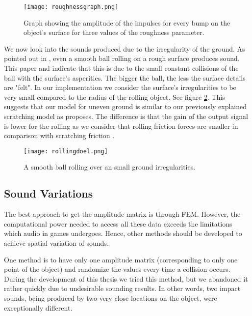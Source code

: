 \begin{figure}[H]
  \centering
    \texttt{[image: roughnessgraph.png]}
      \caption{Graph showing the amplitude of the impulses for every bump on the object's surface for three values of the roughness parameter.}
      \label{fig:roughnessgraph}
\end{figure} 

We now look into the sounds produced due to the irregularity of the ground. As pointed out in \cite{van2001foleyautomatic}, even a smooth ball rolling on a rough surface produces sound. This paper and \cite{rath2003expressive} indicate that this is due to the small constant collisions of the ball with the surface's asperities. The bigger the ball, the less the surface details are "felt". In our implementation we consider the surface's irregularities to be very small compared to the radius of the rolling object. See figure \ref{fig:rollingdoel}. This suggests that our model for uneven ground is similar to our previously explained scratching model as \cite{van2001foleyautomatic} proposes. The difference is that the gain of the output signal is lower for the rolling as we consider that rolling friction forces are smaller in comparison with scratching friction \cite{mehtas}.

\begin{figure}[H]
  \centering
    \texttt{[image: rollingdoel.png]}
      \caption{A smooth ball rolling over an small ground irregularities.}
      \label{fig:rollingdoel}
\end{figure} 

\subsection{Sound Variations}
The best approach to get the amplitude matrix is through FEM. However, the computational power needed to access all these data exceeds the limitations which audio in games undergoes. Hence, other methods should be developed to achieve spatial variation of sounds. 

One method is to have only one amplitude matrix (corresponding to only one point of the object) and randomize the values every time a collision occurs. During the development of this thesis we tried this method, but we abandoned it rather quickly due to undesirable sounding results. In other words, two impact sounds, being produced by two very close locations on the object, were exceptionally different.

